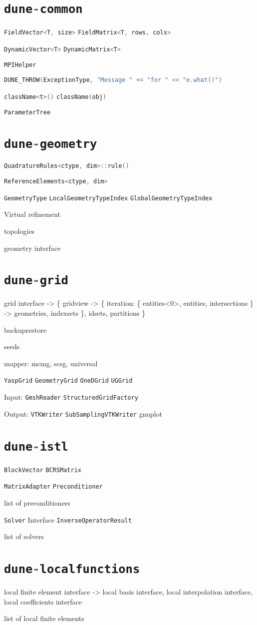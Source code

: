 \documentclass[11pt,DIV=13]{scrartcl}
\def\cxx{\lstinline[language=C++]}
\begin{document}
\section{\cxx{dune-common}}

\cxx{FieldVector<T, size>} \cxx{FieldMatrix<T, rows, cols>}

\cxx{DynamicVector<T>} \cxx{DynamicMatrix<T>}

\cxx{MPIHelper}

\cxx{DUNE_THROW(ExceptionType, "Message " << "for " << "e.what()")}

\cxx{className<t>()} \cxx{className(obj)}

\cxx{ParameterTree}

\section{\cxx{dune-geometry}}

\cxx{QuadratureRules<ctype, dim>::rule()}

\cxx{ReferenceElements<ctype, dim>}

\cxx{GeometryType} \cxx{LocalGeometryTypeIndex} \cxx{GlobalGeometryTypeIndex}

Virtual refinement

topologies

geometry interface

\section{\cxx{dune-grid}}

grid interface -> \{ gridview -> \{ iteration: \{ entities<0>, entities,
      intersections \} -> geometries, indexsets \}, idsets, partitions \}

backuprestore

seeds

mapper: mcmg, scsg, universal

\cxx{YaspGrid} \cxx{GeometryGrid} \cxx{OneDGrid} \cxx{UGGrid}

Input: \cxx{GmshReader} \cxx{StructuredGridFactory}

Output: \cxx{VTKWriter} \cxx{SubSamplingVTKWriter} gnuplot

\section{\cxx{dune-istl}}

\cxx{BlockVector} \cxx{BCRSMatrix}

\cxx{MatrixAdapter} \cxx{Preconditioner}

list of preconditioners

\cxx{Solver} Interface \cxx{InverseOperatorResult}

list of solvers

\section{\cxx{dune-localfunctions}}

local finite element interface -> { local basis interface, local interpolation
  interface, local coefficients interface }

list of local finite elements
\end{document}
